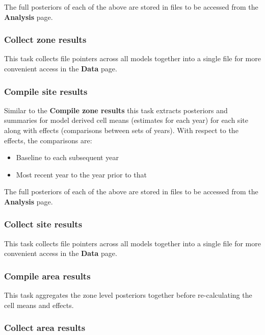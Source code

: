 \documentclass[
  8pt,
  a4paper]{article}
\providecommand{\tightlist}{%
  \setlength{\itemsep}{0pt}\setlength{\parskip}{0pt}}
\begin{document}
The full posteriors of each of the above are stored in files to be
accessed from the \textbf{Analysis} page.

\subsubsection{Collect zone results}\label{collect-zone-results}

This task collects file pointers across all models together into a
single file for more convenient access in the \textbf{Data} page.

\subsubsection{Compile site results}\label{compile-site-results}

Similar to the \textbf{Compile zone results} this task extracts
posteriors and summaries for model derived cell means (estimates for
each year) for each site along with effects (comparisons between sets of
years). With respect to the effects, the comparisons are:

\begin{itemize}
\tightlist
\item
  Baseline to each subsequent year
\item
  Most recent year to the year prior to that
\end{itemize}

The full posteriors of each of the above are stored in files to be
accessed from the \textbf{Analysis} page.

\subsubsection{Collect site results}\label{collect-site-results}

This task collects file pointers across all models together into a
single file for more convenient access in the \textbf{Data} page.

\subsubsection{Compile area results}\label{compile-area-results}

This task aggregates the zone level posteriors together before
re-calculating the cell means and effects.

\subsubsection{Collect area results}\label{collect-area-results}
\end{document}
